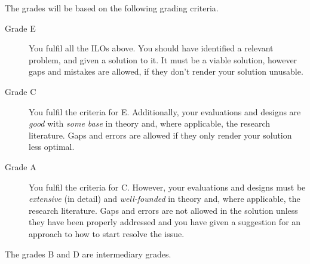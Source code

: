 \documentclass{article}
\begin{document}
The grades will be based on the following grading criteria.
\begin{description}
  \item[Grade E] You fulfil all the \acp{ILO} above.
    You should have identified a relevant problem, and given a solution to it.
    It must be a viable solution, however gaps and mistakes are allowed, if 
    they don't render your solution unusable.

  \item[Grade C] You fulfil the criteria for E.
    Additionally, your evaluations and designs are \emph{good} with \emph{some 
      base} in theory and, where applicable, the research literature.
    Gaps and errors are allowed if they only render your solution less optimal.

  \item[Grade A] You fulfil the criteria for C.
    However, your evaluations and designs must be \emph{extensive} (in detail) 
    and \emph{well-founded} in theory and, where applicable, the research 
    literature.
    Gaps and errors are not allowed in the solution unless they have been 
    properly addressed and you have given a suggestion for an approach to how 
    to start resolve the issue.
\end{description}
The grades B and D are intermediary grades.


\clearpage



\printbibliography
\end{document}
